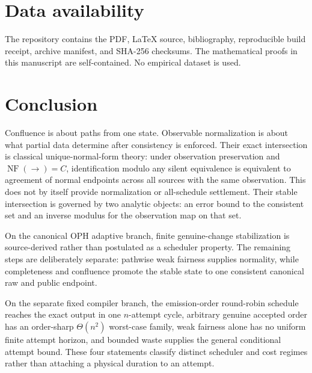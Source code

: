 \documentclass[11pt]{article}
\theoremstyle{definition}
\theoremstyle{remark}
\numberwithin{equation}{section}
\newcommand{\NF}{\operatorname{NF}}
\begin{document}
\section{Data availability}\label{sec:availability}
The repository contains the PDF, LaTeX source, bibliography, reproducible build
receipt, archive manifest, and SHA-256 checksums. The mathematical proofs in
this manuscript are self-contained. No empirical dataset is used.

\section{Conclusion}

Confluence is about paths from one state.  Observable normalization is about what partial data determine after consistency is enforced.  Their exact intersection is classical unique-normal-form theory: under observation preservation and $\NF(\to)=C$, identification modulo any silent equivalence is equivalent to agreement of normal endpoints across all sources with the same observation.  This does not by itself provide normalization or all-schedule settlement.  Their stable intersection is governed by two analytic objects: an error bound to the consistent set and an inverse modulus for the observation map on that set.

On the canonical OPH adaptive branch, finite genuine-change stabilization is
source-derived rather than postulated as a scheduler property.  The remaining
steps are deliberately separate: pathwise weak fairness supplies normality,
while completeness and confluence promote the stable state to one consistent
canonical raw and public endpoint.

On the separate fixed compiler branch, the emission-order round-robin schedule
reaches the exact output in one \(n\)-attempt cycle, arbitrary genuine accepted
order has an order-sharp \(\Theta(n^2)\) worst-case family, weak fairness alone
has no uniform finite attempt horizon, and bounded waste supplies the general
conditional attempt bound.  These four statements classify distinct
scheduler and cost regimes rather than attaching a physical duration to an
attempt.
\end{document}
